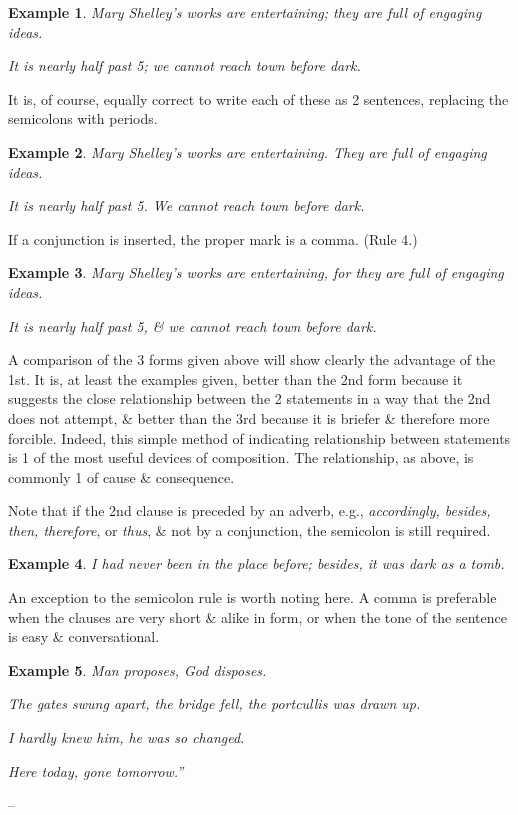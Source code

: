 \documentclass[oneside]{book}
\numberwithin{equation}{section}
\newtheorem{example}{Example}[chapter]
\begin{document}
\begin{example}
	Mary Shelley's works are entertaining; they are full of engaging ideas.
	
	It is nearly half past 5; we cannot reach town before dark.
\end{example}
It is, of course, equally correct to write each of these as 2 sentences, replacing the semicolons with periods.

\begin{example}
	Mary Shelley's works are entertaining. They are full of engaging ideas.
	
	It is nearly half past 5. We cannot reach town before dark.
\end{example}
If a conjunction is inserted, the proper mark is a comma. (Rule 4.)

\begin{example}
	Mary Shelley's works are entertaining, for they are full of engaging ideas.
	
	It is nearly half past 5, \& we cannot reach town before dark.
\end{example}
A comparison of the 3 forms given above will show clearly the advantage of the 1st. It is, at least the examples given, better than the 2nd form because it suggests the close relationship between the 2 statements in a way that the 2nd does not attempt, \& better than the 3rd because it is briefer \& therefore more forcible. Indeed, this simple method of indicating relationship between statements is 1 of the most useful devices of composition. The relationship, as above, is commonly 1 of cause \& consequence.

Note that if the 2nd clause is preceded by an adverb, e.g., \textit{accordingly, besides, then, therefore}, or \textit{thus}, \& not by a conjunction, the semicolon is still required.

\begin{example}
	I had never been in the place before; besides, it was dark as a tomb.
\end{example}
An exception to the semicolon rule is worth noting here. A comma is preferable when the clauses are very short \& alike in form, or when the tone of the sentence is easy \& conversational.

\begin{example}
	Man proposes, God disposes.
	
	The gates swung apart, the bridge fell, the portcullis was drawn up.
	
	I hardly knew him, he was so changed.
	
	Here today, gone tomorrow.''
\end{example}
-- \cite[Chap. 1, Sect. 5, p. 19]{Strunk_White2019}
\end{document}
